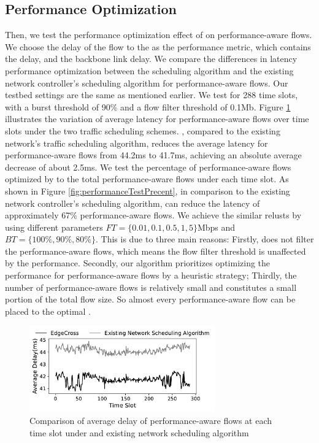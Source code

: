 

\subsection{Performance Optimization}
Then, we test the performance optimization effect of {\sys} on performance-aware flows. We choose the delay of the flow to the {\egress} as the performance metric, which contains the {\egress} delay, and the backbone link delay. We compare the differences in latency performance optimization between the {\sys} scheduling algorithm and the existing network controller's scheduling algorithm for performance-aware flows. Our testbed settings are the same as mentioned earlier. We test for 288 time slots, with a burst threshold of 90\% and a flow filter threshold of 0.1Mb. Figure \ref{fig:performanceTestAbs} illustrates the variation of average latency for performance-aware flows over time slots under the two traffic scheduling schemes. {\sys}, compared to the existing network's traffic scheduling algorithm, reduces the average latency for performance-aware flows from 44.2ms to 41.7ms, achieving an absolute average decrease of about 2.5ms. We test the percentage of performance-aware flows optimized by {\sys} to the total performance-aware flows under each time slot. As shown in Figure \ref{fig:performanceTestPrecent}, in comparison to the existing network controller's scheduling algorithm, {\sys} can reduce the latency of approximately 67\% performance-aware flows.
We achieve the similar relusts by using different parameters $FT=\{0.01, 0.1,0.5,1,5\}$Mbps and $BT=\{100\%, 90\%, 80\%\}$. This is due to three main reasons: Firstly, {\sys} does not filter the performance-aware flows, which means the flow filter threshold is unaffected by the performance. Secondly, our algorithm prioritizes optimizing the performance for performance-aware flows by a heuristic strategy; Thirdly, the number of performance-aware flows is relatively small and constitutes a small portion of the total flow size. So almost every performance-aware flow can be placed to the optimal {\egress}.

\begin{figure}
	\centering
	\includegraphics[width = 8cm]{figs/evaluation/performanceTestAbs.pdf}
	\caption{\small Comparison of average delay of performance-aware flows at each time slot under {\sys} and existing network scheduling algorithm}
	\label{fig:performanceTestAbs}
\end{figure}

